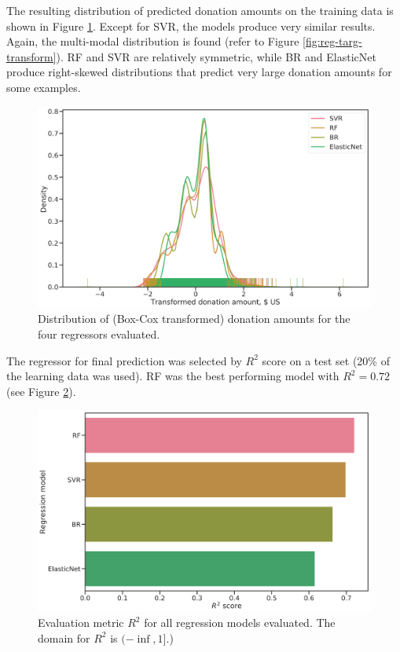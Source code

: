 \documentclass[
  11pt,
  a4paper,
  DIV=12,captions=tableheading,oneside,titlepage]{scrbook}
\begin{document}
The resulting distribution of predicted donation amounts on the training data is shown in Figure \ref{fig:reg-distrib}. Except for SVR, the models produce very similar results. Again, the multi-modal distribution is found (refer to Figure \ref{fig:reg-targ-transform}). RF and SVR are relatively symmetric, while BR and ElasticNet produce right-skewed distributions that predict very large donation amounts for some examples.



\begin{figure}
 
 {\centering \includegraphics[width=0.7\linewidth]{figures/learning/regressor-predictions-comparison} 
 
 }
 
 \caption{Distribution of (Box-Cox transformed) donation amounts for the four regressors evaluated.}\label{fig:reg-distrib}
 \end{figure}

The regressor for final prediction was selected by \(R^2\) score on a test set (20\% of the learning data was used). RF was the best performing model with \(R^2 = 0.72\) (see Figure \ref{fig:reg-eval}).



\begin{figure}

{\centering \includegraphics[width=0.7\linewidth]{figures/learning/regressor-score-comparison} 

}

\caption{Evaluation metric \(R^2\) for all regression models evaluated. The domain for \(R^2\) is \((-\inf, 1]\).)}\label{fig:reg-eval}
\end{figure}
\end{document}

